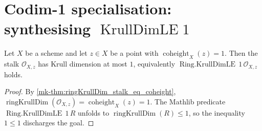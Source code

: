 \section{Codim-1 specialisation: synthesising \texorpdfstring{\(\operatorname{KrullDimLE} 1\)}{KrullDimLE 1}}
\label{mk-sec:coheight_le_one_instance}

\begin{lemma}[Coheight \(= 1\) forces stalk \(\operatorname{Krull\,dim} \leq 1\)]\label{mk-lem:ringKrullDimLE_of_coheight_eq_one}
  \leanok


  Let \(X\) be a scheme and let \(z \in X\) be a point with
  \(\operatorname{coheight}_{X}(z) = 1\). Then the stalk \(\mathcal{O}_{X,z}\)
  has Krull dimension at most \(1\), equivalently \(\operatorname{Ring.KrullDimLE}\,1\,
  \mathcal{O}_{X,z}\) holds.
\end{lemma}

\begin{proof}
  \leanok

  By \ref{mk-thm:ringKrullDim_stalk_eq_coheight},
  \(\operatorname{ringKrullDim}(\mathcal{O}_{X,z}) = \operatorname{coheight}_{X}(z) = 1\).
  The Mathlib predicate \(\operatorname{Ring.KrullDimLE}\,1\,R\) unfolds to
  \(\operatorname{ringKrullDim}(R) \leq 1\), so the inequality \(1 \leq 1\)
  discharges the goal.
\end{proof}
